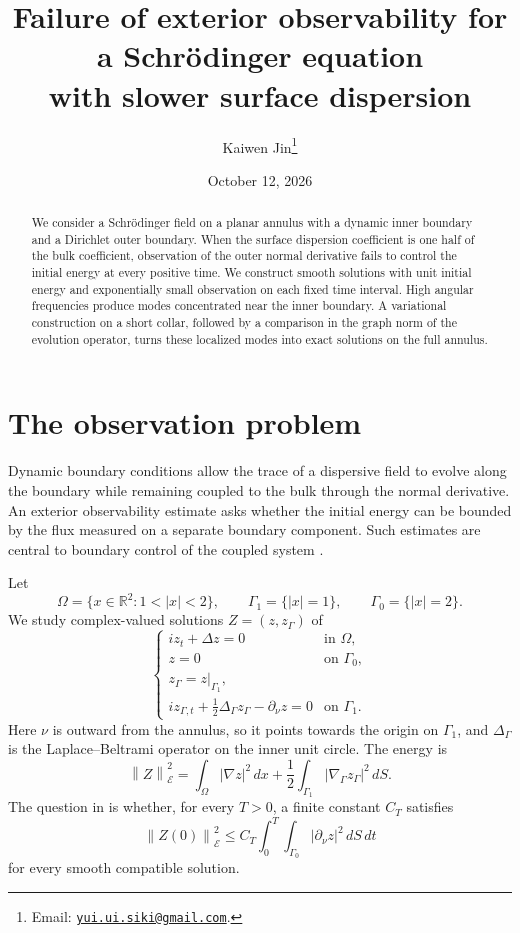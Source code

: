 \documentclass[11pt]{article}
\title{Failure of exterior observability for a Schr\"odinger equation\\
with slower surface dispersion}
\author{Kaiwen Jin\thanks{Email: \href{mailto:yui.ui.siki@gmail.com}{\texttt{yui.ui.siki@gmail.com}}.}}
\date{October 12, 2026}
\newcommand{\EE}{\mathcal E}
\newcommand{\RR}{\mathbb R}
\newcommand{\norm}[1]{\left\|#1\right\|}
\begin{document}
\maketitle

\begin{abstract}
We consider a Schr\"odinger field on a planar annulus with a dynamic inner
boundary and a Dirichlet outer boundary. When the surface dispersion
coefficient is one half of the bulk coefficient, observation of the outer
normal derivative fails to control the initial energy at every positive
time. We construct smooth solutions with unit initial energy and
exponentially small observation on each fixed time interval. High angular
frequencies produce modes concentrated near the inner boundary. A
variational construction on a short collar, followed by a comparison in
the graph norm of the evolution operator, turns these localized modes into
exact solutions on the full annulus.
\end{abstract}

\section{The observation problem}

Dynamic boundary conditions allow the trace of a dispersive field to evolve
along the boundary while remaining coupled to the bulk through the normal
derivative. An exterior observability estimate asks whether the initial
energy can be bounded by the flux measured on a separate boundary component.
Such estimates are central to boundary control of the coupled system
\cite{MM}.

Let
\[
\Omega=\{x\in\RR^2:1<|x|<2\},\qquad
\Gamma_1=\{|x|=1\},\qquad \Gamma_0=\{|x|=2\}.
\]
We study complex-valued solutions \(Z=(z,z_\Gamma)\) of
\begin{equation}\label{eq:system}
\begin{cases}
i z_t+\Delta z=0 & \text{in }\Omega,\\
z=0 & \text{on }\Gamma_0,\\
z_\Gamma=z|_{\Gamma_1},\\
i z_{\Gamma,t}+\frac12\Delta_\Gamma z_\Gamma-\partial_\nu z=0
  & \text{on }\Gamma_1.
\end{cases}
\end{equation}
Here \(\nu\) is outward from the annulus, so it points towards the origin
on \(\Gamma_1\), and \(\Delta_\Gamma\) is the Laplace--Beltrami operator on
the inner unit circle. The energy is
\begin{equation}\label{eq:energy}
\norm{Z}_{\EE}^{2}
=\int_\Omega|\nabla z|^2\,dx
+\frac12\int_{\Gamma_1}|\nabla_\Gamma z_\Gamma|^2\,dS.
\end{equation}
The question in \cite{AIM} is whether, for every \(T>0\), a finite constant
\(C_T\) satisfies
\begin{equation}\label{eq:observation}
\norm{Z(0)}_{\EE}^{2}
\le C_T\int_0^T\int_{\Gamma_0}|\partial_\nu z|^2\,dS\,dt
\end{equation}
for every smooth compatible solution.
\end{document}

